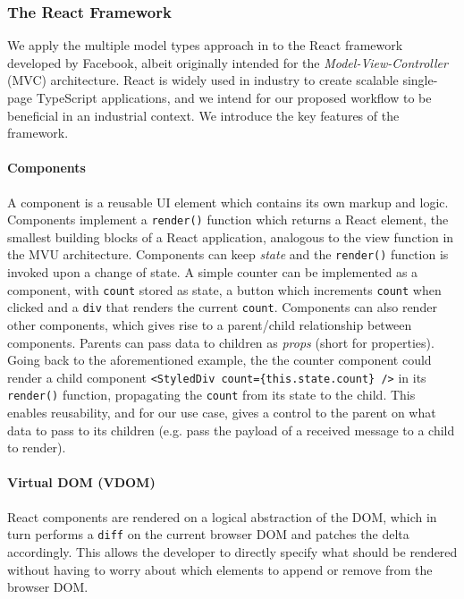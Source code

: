 \subsubsection{The React Framework}


We apply the multiple model types approach in \cite{MVU2019} to the React
framework \cite{React} developed by Facebook, albeit originally intended for
the \textit{Model-View-Controller} (MVC) architecture.
React is widely used in industry to create scalable single-page TypeScript
applications, and we intend for our proposed workflow to be beneficial in an
industrial context.
We introduce the key features of the framework.

\paragraph{Components}
A component is a reusable UI element which
contains its own markup and logic.
Components implement a \texttt{render()} function which returns a React
element, the smallest building blocks of a React application, analogous to the
view function in the MVU architecture.
Components can keep \textit{state} and the \texttt{render()} function is
invoked upon a change of state.
A simple counter can be implemented as a component,
with \texttt{count} stored as state, a button which increments \texttt{count}
when clicked and a \texttt{div} that renders the current
\texttt{count}.
Components can also render other components, which gives rise
to a parent/child relationship between components.
Parents can pass data to children as \textit{props} (short for properties).
Going back to the aforementioned example, the the counter component could
render a child component \texttt{<StyledDiv count=\{this.state.count\} />} in
its \texttt{render()} function, propagating the \texttt{count} from its state
to the child.
This enables reusability, and for our use case, gives a control to the parent
on what data to pass to its children (e.g. pass the payload of a received
message to a child to render).

\paragraph{Virtual DOM (VDOM)}
React components are rendered on a logical
abstraction of the DOM, which in turn performs a \texttt{diff} on the current
browser DOM and patches the delta accordingly.
This allows the developer to
directly specify what should be rendered without having to worry about which
elements to append or remove from the browser DOM.

